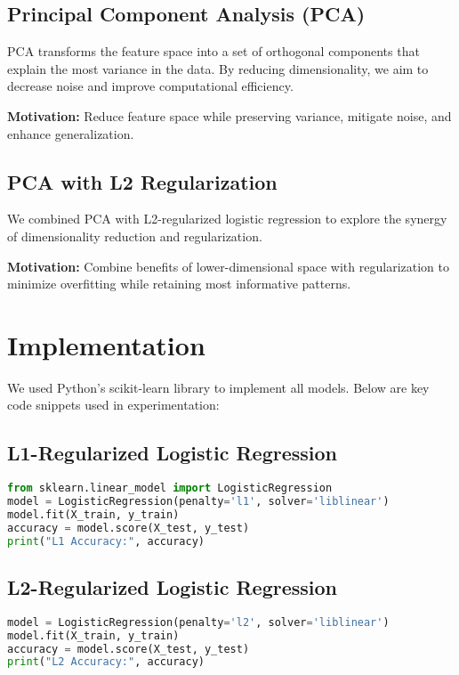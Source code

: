 \documentclass[a4paper,11pt]{article}
\begin{document}
\subsection{Principal Component Analysis (PCA)}
PCA transforms the feature space into a set of orthogonal components that explain the most variance in the data. By reducing dimensionality, we aim to decrease noise and improve computational efficiency.

\textbf{Motivation:} Reduce feature space while preserving variance, mitigate noise, and enhance generalization.

\subsection{PCA with L2 Regularization}
We combined PCA with L2-regularized logistic regression to explore the synergy of dimensionality reduction and regularization.

\textbf{Motivation:} Combine benefits of lower-dimensional space with regularization to minimize overfitting while retaining most informative patterns.

\section{Implementation}
We used Python’s scikit-learn library to implement all models. Below are key code snippets used in experimentation:

\subsection*{L1-Regularized Logistic Regression}
\begin{lstlisting}[language=Python]
from sklearn.linear_model import LogisticRegression
model = LogisticRegression(penalty='l1', solver='liblinear')
model.fit(X_train, y_train)
accuracy = model.score(X_test, y_test)
print("L1 Accuracy:", accuracy)
\end{lstlisting}

\subsection*{L2-Regularized Logistic Regression}
\begin{lstlisting}[language=Python]
model = LogisticRegression(penalty='l2', solver='liblinear')
model.fit(X_train, y_train)
accuracy = model.score(X_test, y_test)
print("L2 Accuracy:", accuracy)
\end{lstlisting}
\end{document}
